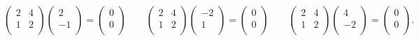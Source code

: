 \begin{equation*}
    \begin{pmatrix}
        2 & 4 \\
        1 & 2 \\
    \end{pmatrix}
    \begin{pmatrix}
        2 \\
        -1 \\
    \end{pmatrix} = 
    \begin{pmatrix}
        0 \\
        0 \\
    \end{pmatrix}\quad  \quad
    \begin{pmatrix}
        2 & 4 \\
        1 & 2 \\
    \end{pmatrix}
    \begin{pmatrix}
        -2 \\
        1 \\
    \end{pmatrix} = 
    \begin{pmatrix}
        0 \\
        0 \\
    \end{pmatrix}\quad  \quad
    \begin{pmatrix}
        2 & 4 \\
        1 & 2 \\
    \end{pmatrix}
    \begin{pmatrix}
        4 \\
        -2 \\
    \end{pmatrix} = 
    \begin{pmatrix}
        0 \\
        0 \\
    \end{pmatrix}.
\end{equation*}

